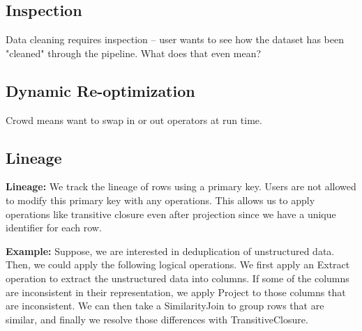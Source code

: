 \subsection{Inspection}

Data cleaning requires inspection -- user wants to see how the dataset
has been "cleaned"  through the pipeline.  What does that even mean?

\subsection{Dynamic Re-optimization}

Crowd means want to swap in or out operators at run time.


\subsection{Lineage}

\noindent\textbf{Lineage: }
We track the lineage of rows using a primary key.
Users are not allowed to modify this primary key with any operations.
This allows us to apply operations like transitive closure even after projection since we have a unique identifier for each row.

\vspace{0.5em}
\noindent \textbf{Example: } Suppose, we are interested in deduplication of unstructured data. Then, we could apply the following logical operations.
We first apply an \textsf{Extract} operation to extract the unstructured data into columns. If some of the columns are inconsistent in their representation,
we apply \textsf{Project} to those columns that are inconsistent. We can then take a \textsf{SimilarityJoin} to group rows that are similar, and finally
we resolve those differences with \textsf{TransitiveClosure}.
\fi


